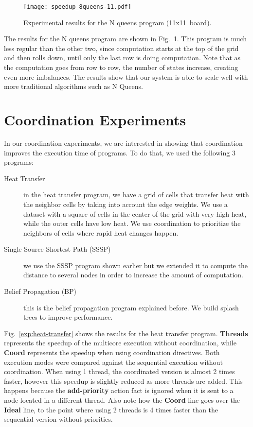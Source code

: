 \begin{figure}[h!]
     \centering
    \texttt{[image: speedup\_8queens-11.pdf]}
    \caption{Experimental results for the N queens program (11x11~board).}
    \label{exp:8queens}
\end{figure}

The results for the N queens program are shown in Fig.~\ref{exp:8queens}. This program is much less regular than the other two, since computation starts at the top of the grid and then rolls down, until only the last row is doing computation. Note that as the computation goes from row to row, the number of states increase, creating even more imbalances. The results show that our system is able to scale well with more traditional algorithms such as N Queens.

\section{Coordination Experiments}

In our coordination experiments, we are interested in showing that coordination improves the execution time of programs.
To do that, we used the following 3 programs:

\begin{description}
   \item[Heat Transfer] in the heat transfer program, we have a grid of cells that transfer heat with the neighbor cells by taking into account the edge weights. We use a dataset with a square of cells in the center of the grid with very high heat, while the outer cells have low heat. We use coordination to prioritize the neighbors of cells where rapid heat changes happen.
   \item[Single Source Shortest Path (SSSP)] we use the SSSP program shown earlier but we extended it to compute the distance to several nodes in order to increase the amount of computation.
   \item[Belief Propagation (BP)] this is the belief propagation program explained before. We build splash trees to improve performance.
\end{description}

Fig.~\ref{exp:heat-transfer} shows the results for the heat transfer program. \textbf{Threads} represents the speedup of the multicore execution
without coordination, while \textbf{Coord} represents the speedup when using coordination directives.
Both execution modes were compared against the sequential execution without coordination.
When using 1 thread, the coordinated version is almost 2 times
faster, however this speedup is slightly reduced as more threads are added. This happens because the \textbf{add-priority} action fact is ignored
when it is sent to a node located in a different thread.
Also note how the \textbf{Coord} line goes over the \textbf{Ideal} line, to the point where using 2 threads is 4 times faster than the sequential
version without priorities.

